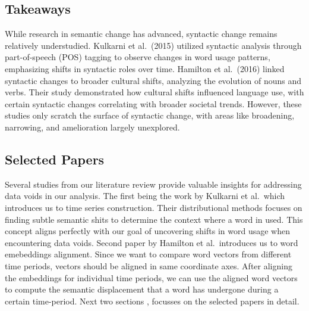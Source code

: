 \subsection{Takeaways}\label{subsec:takeaways3}
While research in semantic change has advanced, syntactic change remains relatively understudied.
Kulkarni et al.\ (2015) utilized syntactic analysis through part-of-speech (POS) tagging to observe changes in word usage patterns, emphasizing shifts in syntactic roles over time.
Hamilton et al.\ (2016) linked syntactic changes to broader cultural shifts, analyzing the evolution of nouns and verbs.
Their study demonstrated how cultural shifts influenced language use, with certain syntactic changes correlating with broader societal trends.
However, these studies only scratch the surface of syntactic change, with areas like broadening, narrowing, and amelioration largely unexplored.

\subsection{Selected Papers}\label{subsec:selected-papers}
Several studies from our literature review provide valuable insights for addressing data voids in our analysis.
The first being the work by Kulkarni et al.\ which introduces us to time series construction.
Their distributional methods focuses on finding subtle semantic shits to determine the context where a word in used.
This concept aligns perfectly with our goal of uncovering shifts in word usage when encountering data voids.
Second paper by Hamilton et al.\ introduces us to word emebeddings alignment.
Since we want to compare word vectors from different time periods, vectors should be aligned in same coordinate axes.
After aligning the embeddings for individual time periods, we can use the aligned word vectors to compute the semantic displacement that a word has undergone during a certain time-period.
Next two sections ,  focusses on the selected papers in detail.
